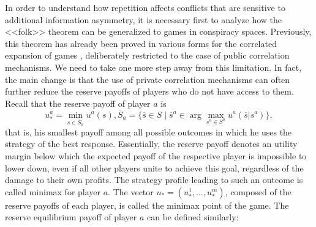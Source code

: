 In order to understand how repetition affects conflicts that are sensitive to additional information asymmetry, it is necessary first to analyze how the <<folk>> theorem can be generalized to games in conspiracy spaces. Previously, this theorem has already been proved in various forms for the correlated expansion of games \cite{Fudenberg}, deliberately restricted to the case of public correlation mechanisms. We need to take one more step away from this limitation. In fact, the main change is that the use of private correlation mechanisms can often further reduce the reserve payoffs of players who do not have access to them. Recall that the reserve payoff of player $a$ is %
\begin{equation*}
	u^a_* = \min_{s \in \overline{S}_a} u^a(s), \overline{S}_a = \{\overline{s} \in S \mid \overline{s}^a \in \arg\max_{s^a \in S^a} u^a(\overline{s} | s^a)\},
\end{equation*}
that is, his smallest payoff among all possible outcomes in which he uses the strategy of the best response. Essentially, the reserve payoff denotes an utility margin below which the expected payoff of the respective player is impossible to lower down, even if all other players unite to achieve this goal, regardless of the damage to their own profits. The strategy profile leading to such an outcome is called minimax for player $a$. The vector $u_* = (u^1_*, \ldots, u^m_*)$, composed of the reserve payoffs of each player, is called the minimax point of the game. The reserve equilibrium payoff of player $a$ can be defined similarly: %
